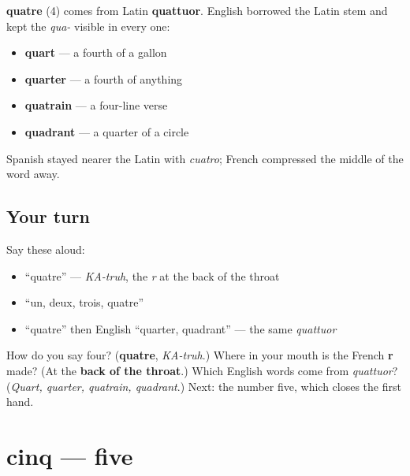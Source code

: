 \begin{cousinweb}
\textbf{quatre} (4) comes from Latin \textbf{quattuor}. English borrowed the Latin stem and kept the \emph{qua-} visible in every one:

\begin{itemize}
\raggedright
  \item \textbf{quart} — a fourth of a gallon
  \item \textbf{quarter} — a fourth of anything
  \item \textbf{quatrain} — a four-line verse
  \item \textbf{quadrant} — a quarter of a circle
\end{itemize}

Spanish stayed nearer the Latin with \emph{cuatro}; French compressed the middle of the word away.
\end{cousinweb}

\subsection*{Your turn}
Say these aloud:

\begin{itemize}
\raggedright
  \item \textquotedblleft{}quatre\textquotedblright{} — \emph{KA-truh}, the \emph{r} at the back of the throat
  \item \textquotedblleft{}un, deux, trois, quatre\textquotedblright{}
  \item \textquotedblleft{}quatre\textquotedblright{} then English \textquotedblleft{}quarter, quadrant\textquotedblright{} — the same \emph{quattuor}
\end{itemize}

\begin{tcolorbox}[breakable,colback=teal!4,colframe=teal!35!black,title={Before you move on}]
How do you say four? (\textbf{quatre}, \emph{KA-truh}.) Where in your mouth is the French \textbf{r} made? (At the \textbf{back of the throat}.) Which English words come from \emph{quattuor}? (\emph{Quart, quarter, quatrain, quadrant}.) Next: the number five, which closes the first hand.
\end{tcolorbox}
\section[cinq]{cinq — five}

\label{lesson:FR-C06-cinq}



